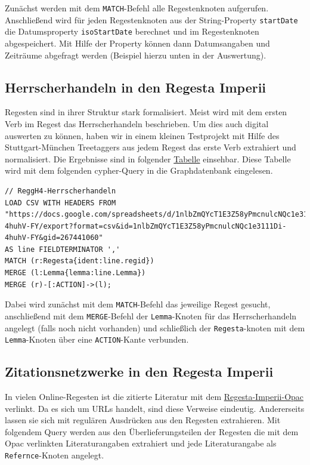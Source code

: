 \documentclass[ngerman,]{scrreprt}
\begin{document}
Zunächst werden mit dem \texttt{MATCH}-Befehl alle Regestenknoten aufgerufen. Anschließend wird für jeden Regestenknoten aus der String-Property \texttt{startDate} die Datumsproperty \texttt{isoStartDate} berechnet und im Regestenknoten abgespeichert. Mit Hilfe der Property können dann Datumsangaben und Zeiträume abgefragt werden (Beispiel hierzu unten in der Auswertung).

\subsection{Herrscherhandeln in den Regesta Imperii}\label{herrscherhandeln-in-den-regesta-imperii}

Regesten sind in ihrer Struktur stark formalisiert. Meist wird mit dem ersten Verb im Regest das Herrscherhandeln beschrieben. Um dies auch digital auswerten zu können, haben wir in einem kleinen Testprojekt mit Hilfe des Stuttgart-München Treetaggers aus jedem Regest das erste Verb extrahiert und normalisiert. Die Ergebnisse sind in folgender \href{https://docs.google.com/spreadsheets/d/1nlbZmQYcT1E3Z58yPmcnulcNQc1e3111Di-4huhV-FY/edit?usp=sharing}{Tabelle} einsehbar. Diese Tabelle wird mit dem folgenden cypher-Query in die Graphdatenbank eingelesen.

\begin{verbatim}
// ReggH4-Herrscherhandeln
LOAD CSV WITH HEADERS FROM "https://docs.google.com/spreadsheets/d/1nlbZmQYcT1E3Z58yPmcnulcNQc1e3111Di-4huhV-FY/export?format=csv&id=1nlbZmQYcT1E3Z58yPmcnulcNQc1e3111Di-4huhV-FY&gid=267441060"
AS line FIELDTERMINATOR ','
MATCH (r:Regesta{ident:line.regid})
MERGE (l:Lemma{lemma:line.Lemma})
MERGE (r)-[:ACTION]->(l);
\end{verbatim}

Dabei wird zunächst mit dem \texttt{MATCH}-Befehl das jeweilige Regest gesucht, anschließend mit dem \texttt{MERGE}-Befehl der \texttt{Lemma}-Knoten für das Herrscherhandeln angelegt (falls noch nicht vorhanden) und schließlich der \texttt{Regesta}-knoten mit dem \texttt{Lemma}-Knoten über eine \texttt{ACTION}-Kante verbunden.

\subsection{Zitationsnetzwerke in den Regesta Imperii}\label{zitationsnetzwerke-in-den-regesta-imperii}

In vielen Online-Regesten ist die zitierte Literatur mit dem \href{http://opac.regesta-imperii.de/lang_de/}{Regesta-Imperii-Opac} verlinkt. Da es sich um URLs handelt, sind diese Verweise eindeutig. Andererseits lassen sie sich mit regulären Ausdrücken aus den Regesten extrahieren. Mit folgendem Query werden aus den Überlieferungsteilen der Regesten die mit dem Opac verlinkten Literaturangaben extrahiert und jede Literaturangabe als \texttt{Refernce}-Knoten angelegt.
\end{document}
